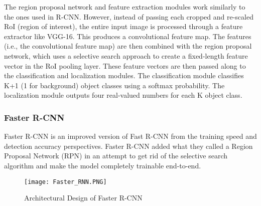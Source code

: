 The region proposal network and feature extraction modules work similarly to the ones used in R-CNN. However, instead of passing each cropped and re-scaled RoI (region of interest), the entire input image is processed through a feature extractor like VGG-16. This produces a convolutional feature map. The features (i.e., the convolutional feature map) are then combined with the region proposal network, which uses a selective search approach to create a fixed-length feature vector in the RoI pooling layer. These feature vectors are then passed along to the classification and localization modules. The classification module classifies K+1 (1 for background) object classes using a softmax probability. The localization module outputs four real-valued numbers for each K object class. \cite{girshick2015fast}
\subsubsection{Faster R-CNN}
Faster R-CNN is an improved version of Fast R-CNN from the training speed and detection accuracy perspectives.
Faster R-CNN added what they called a Region Proposal Network (RPN) in an attempt to get rid of the selective search algorithm and make the model completely trainable end-to-end.

\begin{figure}[H]
    \centering
    \texttt{[image: Faster\_RNN.PNG]}
    \caption{Architectural Design of Faster R-CNN \cite{ansari2020building}}
    \label{fig:Faster R-CNN}
\end{figure}

